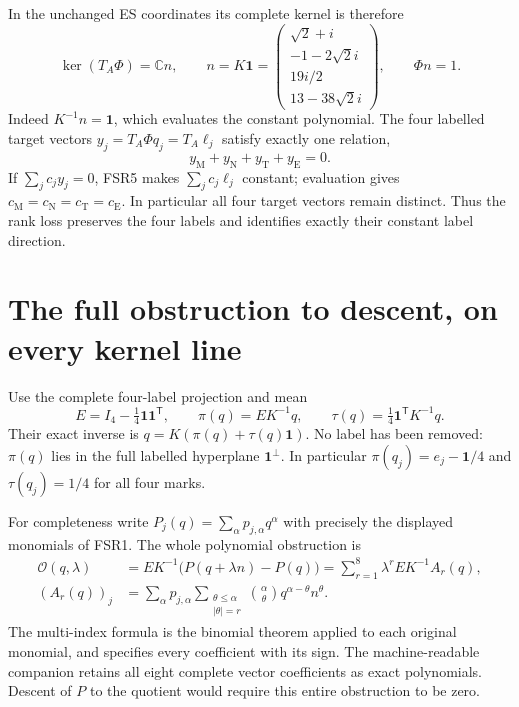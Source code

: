 \documentclass[11pt]{article}
\newcommand{\C}{\mathbb C}
\begin{document}
In the unchanged ES coordinates its complete kernel is therefore
\[
 \ker(T_A\Phi)=\C n,\qquad
 n=K\mathbf1=
 \begin{pmatrix}\sqrt2+i\\-1-2\sqrt2i\\19i/2\\13-38\sqrt2i\end{pmatrix},
 \qquad \Phi n=1.
 \tag{FSR6}
\]
Indeed $K^{-1}n=\mathbf1$, which evaluates the constant polynomial.
The four labelled target vectors $y_j=T_A\Phi q_j=T_A\ell_j$
satisfy exactly one relation,
\[
 y_{\mathrm M}+y_{\mathrm N}+y_{\mathrm T}+y_{\mathrm E}=0.
 \tag{FSR7}
\]
If $\sum_jc_jy_j=0$, FSR5 makes $\sum_jc_j\ell_j$ constant;
evaluation gives $c_{\mathrm M}=c_{\mathrm N}=c_{\mathrm T}=c_{\mathrm E}$.
In particular all four target vectors remain distinct. Thus the
rank loss preserves the four labels and identifies exactly their
constant label direction.

\section{The full obstruction to descent, on every kernel line}
Use the complete four-label projection and mean
\[
 E=I_4-\tfrac14\mathbf1\mathbf1^{\mathsf T},\qquad
 \pi(q)=EK^{-1}q,\qquad
 \tau(q)=\tfrac14\mathbf1^{\mathsf T}K^{-1}q.
 \tag{FSR8}
\]
Their exact inverse is $q=K(\pi(q)+\tau(q)\mathbf1)$.
No label has been removed: $\pi(q)$ lies in the full labelled
hyperplane $\mathbf1^\perp$. In particular
$\pi(q_j)=e_j-\mathbf1/4$ and $\tau(q_j)=1/4$ for all four marks.

For completeness write $P_j(q)=\sum_\alpha p_{j,\alpha}q^\alpha$
with precisely the displayed monomials of FSR1. The whole
polynomial obstruction is
\[
\begin{split}
 \mathcal O(q,\lambda)&=EK^{-1}\bigl(P(q+\lambda n)-P(q)\bigr)
                  =\sum_{r=1}^8\lambda^r EK^{-1}A_r(q),\\
 (A_r(q))_j&=\sum_\alpha p_{j,\alpha}
       \sum_{\substack{\theta\le\alpha\\|\theta|=r}}
           \binom\alpha\theta q^{\alpha-\theta}n^\theta .
\end{split}\tag{FSR9}
\]
The multi-index formula is the binomial theorem applied to each
original monomial, and specifies every coefficient with its sign.
The machine-readable companion retains all eight complete vector
coefficients as exact polynomials. Descent of $P$ to the quotient
would require this entire obstruction to be zero.
\end{document}
